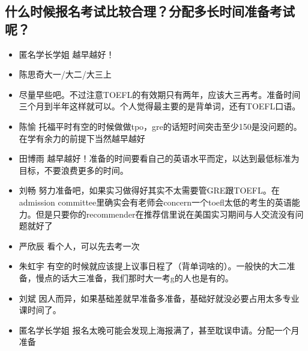 \documentclass{vivid_layout}
\begin{document}
\subsection{ 什么时候报名考试比较合理？分配多长时间准备考试呢？}
\begin{itemize}
\item  {\name 匿名学长学姐}  \quad 越早越好！
\item { 陈思奇}\quad 大一/大二/大三上
\item 尽量早些吧。不过注意TOEFL的有效期只有两年，应该大三再考。准备时间三个月到半年这样就可以。个人觉得最主要的是背单词，还有TOEFL口语。
\item  { 陈愉}  \quad 托福平时有空的时候做做tpo，gre的话短时间突击至少150是没问题的。在学有余力的前提下当然越早越好
\item  { 田博雨}  \quad 越早越好！准备的时间要看自己的英语水平而定，以达到最低标准为目标，不要浪费更多的时间。
\item  { 刘畅}  \quad 努力准备吧，如果实习做得好其实不太需要管GRE跟TOEFL。在admission committee里确实会有老师会concern一个toefl太低的考生的英语能力。但是只要你的recommender在推荐信里说在美国实习期间与人交流没有问题就好了
\item  { 严欣辰}  \quad 看个人，可以先去考一次
\item  { 朱虹宇}  \quad 有空的时候就应该提上议事日程了（背单词啥的）。一般快的大二准备，慢点的话大三准备，我们那时大一考g的人也是有的。
\item  { 刘斌}  \quad 因人而异，如果基础差就早准备多准备，基础好就没必要占用太多专业课时间了。
\item  {\name 匿名学长学姐}  \quad 报名太晚可能会发现上海报满了，甚至耽误申请。分配一个月准备
\end{itemize}
\end{document}
